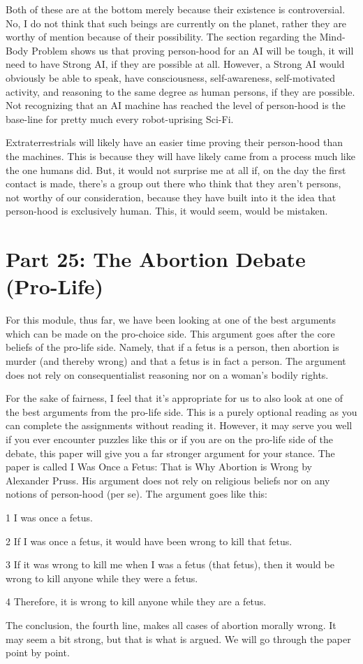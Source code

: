 Both of these are at the bottom merely because their existence is controversial. No, I do not think that such beings are currently on the planet, rather they are worthy of mention because of their possibility. The section regarding the Mind-Body Problem shows us that proving person-hood for an AI will be tough, it will need to have Strong AI, if they are possible at all. However, a Strong AI would obviously be able to speak, have consciousness, self-awareness, self-motivated activity, and reasoning to the same degree as human persons, if they are possible. Not recognizing that an AI machine has reached the level of person-hood is the base-line for pretty much every robot-uprising Sci-Fi. 

Extraterrestrials will likely have an easier time proving their person-hood than the machines. This is because they will have likely came from a process much like the one humans did. But, it would not surprise me at all if, on the day the first contact is made, there's a group out there who think that they aren't persons, not worthy of our consideration, because they have built into it the idea that person-hood is exclusively human. This, it would seem, would be mistaken. 

\chapter{Part 25: The Abortion Debate (Pro-Life)}
For this module, thus far, we have been looking at one of the best arguments which can be made on the pro-choice side. This argument goes after the core beliefs of the pro-life side. Namely, that if a fetus is a person, then abortion is murder (and thereby wrong) and that a fetus is in fact a person. The argument does not rely on consequentialist reasoning nor on a woman's bodily rights.

For the sake of fairness, I feel that it's appropriate for us to also look at one of the best arguments from the pro-life side.  This is a purely optional reading as you can complete the assignments without reading it. However, it may serve you well if you ever encounter puzzles like this or if you are on the pro-life side of the debate, this paper will give you a far stronger argument for your stance. The paper is called I Was Once a Fetus: That is Why Abortion is Wrong by Alexander Pruss. His argument does not rely on religious beliefs nor on any notions of person-hood (per se). The argument goes like this:
\begin{earg}
    \item[1 ]I was once a fetus.
    \item[2 ]If I was once a fetus, it would have been wrong to kill that fetus.
    \item[3 ]If it was wrong to kill me when I was a fetus (that fetus), then it would be wrong to kill anyone while they were a fetus.
    \item[4 ]Therefore, it is wrong to kill anyone while they are a fetus.
\end{earg}
The conclusion, the fourth line, makes all cases of abortion morally wrong. It may seem a bit strong, but that is what is argued. We will go through the paper point by point.
